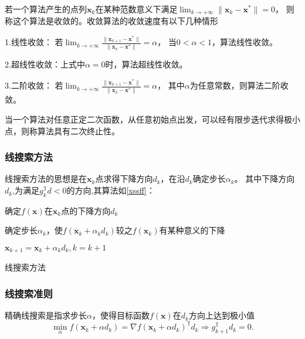 若一个算法产生的点列${\bm{x}_k}$在某种范数意义下满足$\displaystyle\lim_{k \to +\infty}\|\bm{x}_k-\bm{x}^*\|=0$，
则称这个算法是收敛的。收敛算法的收敛速度有以下几种情形

1.线性收敛：
若$\displaystyle\lim_{k \to +\infty}\frac{\|\bm{x}_{k+1}-\bm{x}^*\|}{\|\bm{x}_k-\bm{x}^*\|}= \alpha$，
当$0 < \alpha < 1$，算法线性收敛。

2.超线性收敛：上式中$\alpha = 0$时，算法超线性收敛。

3.二阶收敛：
若$\displaystyle\lim_{k \to +\infty}\frac{\|\bm{x}_{k+1}-\bm{x}^*\|}{\|\bm{x}_k-\bm{x}^*\|}=\alpha$，
其中$\alpha$为任意常数，则算法二阶收敛。
    
\begin{definition}[二次终止性]
    当一个算法对任意正定二次函数，从任意初始点出发，可以经有限步迭代求得极小点，则称算法具有二次终止性。
\end{definition}
    
\subsubsection{线搜索方法}
线搜索方法的思想是在$\bm{x}_k$点求得下降方向$d_k$，在沿$d_k$确定步长$\alpha_k$。
其中下降方向$d_k$,为满足$g_k^{\mathbb{T}}d<0$的方向,其算法如\ref{xssff}：

\begin{algorithm}
    \SetAlgoLined
     {
        确定$f(\bm{x})$在$\bm{x}_k$点的下降方向$d_k$
        
        确定步长$\alpha_k$，使$f(\bm{x}_k + \alpha_kd_k)$较之$f(\bm{x}_k)$有某种意义的下降
        
        $\bm{x}_{k+1} = \bm{x}_k + \alpha_kd_k,k=k+1$
    }
    \caption{线搜索方法}
    \label{xssff}
\end{algorithm}


\subsubsection{线搜索准则}

\begin{theorem}[精确线搜索准则]
    精确线搜索是指求步长$\alpha$，使得目标函数$f(\bm{x})$在$d_k$方向上达到极小值
    \begin{equation}
        \min_\alpha f(\bm{x}_k+\alpha d_k) = \nabla f(\bm{x}_k+\alpha d_k)^{\mathbb{T}}d_k \Rightarrow g_{k+1}^{\mathbb{T}}d_k=0 .
    \end{equation}
\end{theorem}

